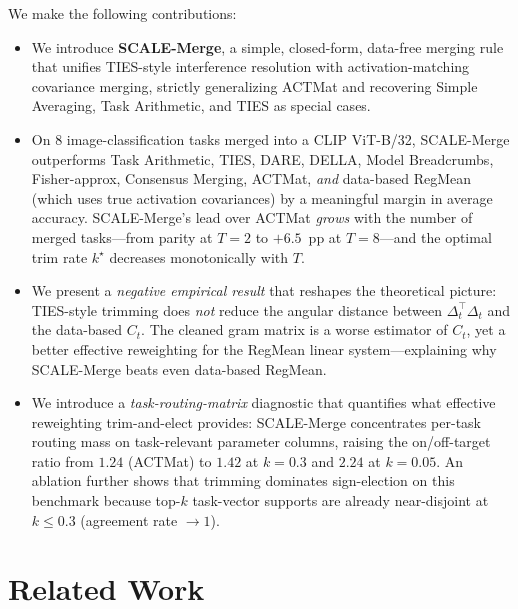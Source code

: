 \documentclass{article} %
\begin{document}
We make the following contributions:
\begin{itemize}
    \item We introduce \textbf{SCALE-Merge}, a simple, closed-form, data-free merging rule that unifies TIES-style interference resolution with activation-matching covariance merging, strictly generalizing ACTMat and recovering Simple Averaging, Task Arithmetic, and TIES as special cases.
    \item On 8 image-classification tasks merged into a CLIP ViT-B/32, SCALE-Merge outperforms Task Arithmetic, TIES, DARE, DELLA, Model Breadcrumbs, Fisher-approx, Consensus Merging, ACTMat, \emph{and} data-based RegMean (which uses true activation covariances) by a meaningful margin in average accuracy. SCALE-Merge's lead over ACTMat \emph{grows} with the number of merged tasks---from parity at $T{=}2$ to $+6.5$~pp at $T{=}8$---and the optimal trim rate $k^\star$ decreases monotonically with $T$.
    \item We present a \emph{negative empirical result} that reshapes the theoretical picture: TIES-style trimming does \emph{not} reduce the angular distance between $\Delta_t^\top\Delta_t$ and the data-based $C_t$. The cleaned gram matrix is a worse estimator of $C_t$, yet a better effective reweighting for the RegMean linear system---explaining why SCALE-Merge beats even data-based RegMean.
    \item We introduce a \emph{task-routing-matrix} diagnostic that quantifies what effective reweighting trim-and-elect provides: SCALE-Merge concentrates per-task routing mass on task-relevant parameter columns, raising the on/off-target ratio from $1.24$ (ACTMat) to $1.42$ at $k{=}0.3$ and $2.24$ at $k{=}0.05$. An ablation further shows that trimming dominates sign-election on this benchmark because top-$k$ task-vector supports are already near-disjoint at $k\leq 0.3$ (agreement rate $\to 1$).
\end{itemize}

\section{Related Work}
\label{sec:related}
\end{document}
